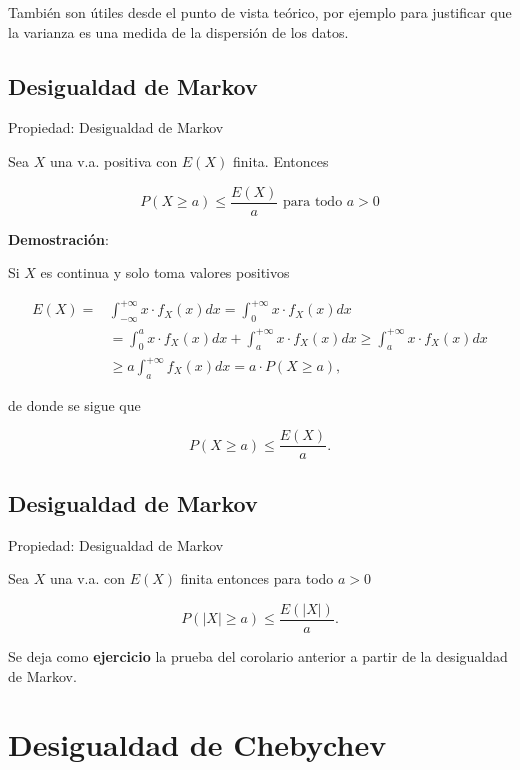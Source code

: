 \documentclass[
  letterpaper,
  DIV=11,
  numbers=noendperiod]{scrreprt}
\begin{document}
También son útiles desde el punto de vista teórico, por ejemplo para
justificar que la varianza es una medida de la dispersión de los datos.

\subsection{Desigualdad de Markov}\label{desigualdad-de-markov}

\begin{Proposicion}{Propiedad: Desigualdad de Markov}{}

Sea \(X\) una v.a. positiva con \(E(X)\) finita. Entonces

\[
P(X\geq a)\leq \frac{E(X)}{a}\mbox{ para todo }a>0
\]

\end{Proposicion}

\textbf{Demostración}:

Si \(X\) es continua y solo toma valores positivos

\begin{align*}
E(X) =& \int_{-\infty}^{+\infty} x\cdot f_{X}(x) dx=  
\int_0^{+\infty} x\cdot f_{X}(x) dx\\ 
& =  \int_0^{a} x\cdot f_{X}(x) dx +\int_{a}^{+\infty} x\cdot f_{X}(x) dx
 \geq   \int_{a}^{+\infty} x\cdot f_{X}(x) dx \\
& \geq a \int_{a}^{+\infty}
f_{X}(x) dx = a \cdot  P(X\geq a),
\end{align*}

de donde se sigue que

\[P(X\geq a)\leq \frac{E(X)}{a}.\]

\subsection{Desigualdad de Markov}\label{desigualdad-de-markov-1}

\begin{Proposicion}{Propiedad: Desigualdad de Markov}{}

Sea \(X\) una v.a. con \(E(X)\) finita entonces para todo \(a>0\)

\[P(|X|\geq a )\leq \frac{E(|X|)}{a}.\]

\end{Proposicion}

Se deja como \textbf{ejercicio} la prueba del corolario anterior a
partir de la desigualdad de Markov.

\section{Desigualdad de Chebychev}\label{desigualdad-de-chebychev}
\end{document}

